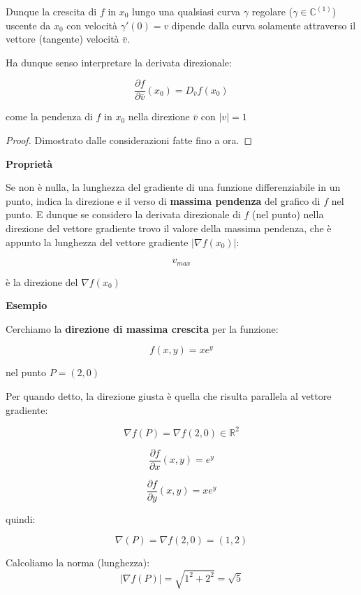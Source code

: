 \documentclass[11pt]{article}
\begin{document}
Dunque la crescita di $f$ in $x_0$ lungo una qualsiasi curva $\gamma$ regolare ($\gamma \in \mathbb{C}^{(1)}$) uscente da $x_0$ con velocità $\gamma'(0) = v$ dipende dalla curva solamente attraverso il vettore (tangente) velocità $\bar{v} $.


Ha dunque senso interpretare la derivata direzionale:

\[
    \frac{\partial f}{\partial \bar{v} } (x_0) = D_{\bar{v}}f(x_0)
\]

come la pendenza di $f$ in $x_0$ nella direzione $\bar{v} $ con $|v|=1$


\begin{proof}
       Dimostrato dalle considerazioni fatte fino a ora.    
\end{proof}

\textbf{Proprietà} 

Se non è nulla, la lunghezza del gradiente di una funzione differenziabile in un punto, indica la direzione e il verso di \textbf{massima pendenza}  del grafico di $f$ nel punto. E dunque se considero la derivata direzionale di $f$ (nel punto) nella direzione del vettore gradiente trovo il valore della massima pendenza, che è appunto la lunghezza del vettore gradiente $|\nabla f(x_0)|$:

\[
    v_{max} 
\]

è la direzione del $\nabla f(x_0)$


\textbf{Esempio} 

Cerchiamo la \textbf{direzione di massima crescita}  per la funzione:

\[
    f(x,y) = xe^{y}
\]

nel punto $P=(2,0)$

Per quando detto, la direzione giusta è quella che risulta parallela al vettore gradiente:

\[
    \nabla f(P) = \nabla f(2,0) \in \mathbb{R}^{2}
\]

\[
    \frac{\partial f}{\partial x}(x,y)  = e ^{y}
\]

\[
    \frac{\partial f}{\partial y}(x,y) = xe^{y}
\]

quindi:

\[
    \nabla(P) = \nabla f(2,0) = (1,2)
\]


Calcoliamo la norma (lunghezza):
\[
    |\nabla f(P) | = \sqrt{1^{2}+2^{2}} = \sqrt{5}
\]
\end{document}
